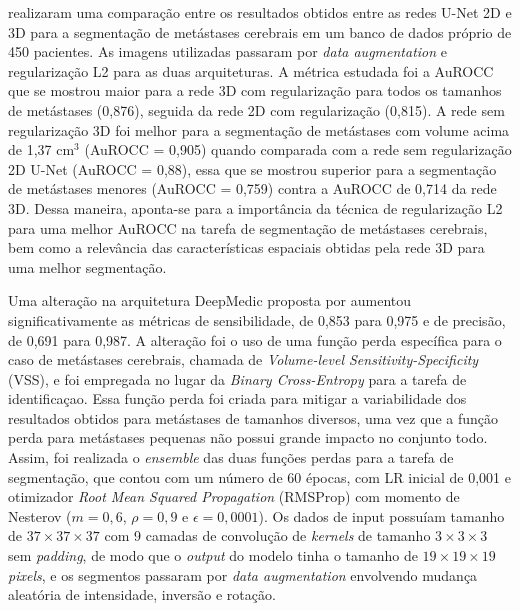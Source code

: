\cite{Sun:2021} realizaram uma comparação entre os resultados obtidos entre as redes U-Net 2D e 3D para a segmentação de metástases cerebrais em um banco de dados próprio de 450 pacientes. As imagens utilizadas passaram por \textit{data augmentation} e regularização L2 para as duas arquiteturas. A métrica estudada foi a AuROCC que se mostrou maior para a rede 3D com regularização para todos os tamanhos de metástases (0,876), seguida da rede 2D com regularização (0,815). A rede sem regularização 3D foi melhor para a segmentação de metástases com volume acima de 1,37 cm$^3$ (AuROCC = 0,905) quando comparada com a rede sem regularização 2D U-Net (AuROCC = 0,88), essa que se mostrou superior para a segmentação de metástases menores (AuROCC = 0,759) contra a AuROCC de 0,714 da rede 3D. Dessa maneira, aponta-se para a importância da técnica de regularização L2 para uma melhor AuROCC na tarefa de segmentação de metástases cerebrais, bem como a relevância das características espaciais obtidas pela rede 3D para uma melhor segmentação.

Uma alteração na arquitetura DeepMedic proposta por \cite{Huang:2022} aumentou significativamente as métricas de sensibilidade, de 0,853 para 0,975 e de precisão, de 0,691 para 0,987. A alteração foi o uso de uma função perda específica para o caso de metástases cerebrais, chamada de \textit{Volume-level Sensitivity-Specificity} (VSS), e foi empregada no lugar da \textit{Binary Cross-Entropy} para a tarefa de identificaçao. Essa função perda foi criada para mitigar a variabilidade dos resultados obtidos para metástases de tamanhos diversos, uma vez que a função perda para metástases pequenas não possui grande impacto no conjunto todo. Assim, foi realizada o \textit{ensemble} das duas funções perdas para a tarefa de segmentação, que contou com um número de 60 épocas, com LR inicial de 0,001 e otimizador \textit{Root Mean Squared Propagation} (RMSProp) com momento de Nesterov ($m=0,6$, $\rho=0,9$ e $\epsilon = 0,0001$). Os dados de input possuíam tamanho de $37\times37\times37$ com 9 camadas de convolução de \textit{kernels} de tamanho $3\times3\times3$ sem \textit{padding}, de modo que o \textit{output} do modelo tinha o tamanho de $19\times19\times19$ \textit{pixels}, e os segmentos passaram por \textit{data augmentation} envolvendo mudança aleatória de intensidade, inversão e rotação.

